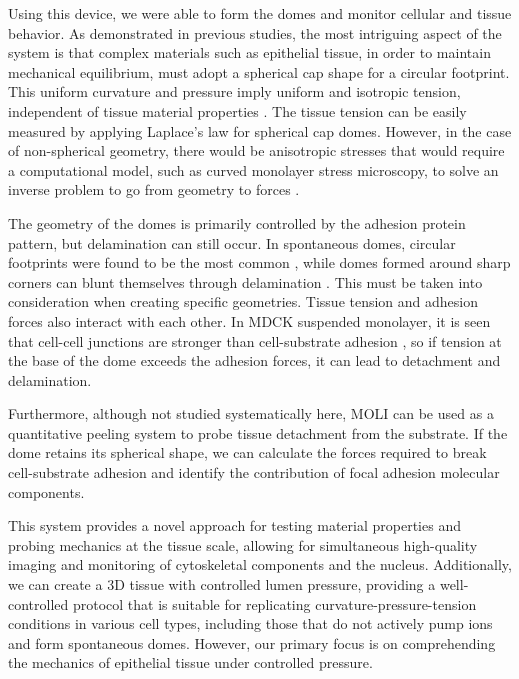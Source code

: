 Using this device, we were able to form the domes and monitor cellular and tissue behavior. As demonstrated in previous studies, the most intriguing aspect of the system is that complex materials such as epithelial tissue, in order to maintain mechanical equilibrium, must adopt a spherical cap shape for a circular footprint. This uniform curvature and pressure imply uniform and isotropic tension, independent of tissue material properties \cite{latorre2018,marin-llaurado2022}. The tissue tension can be easily measured by applying Laplace's law for spherical cap domes. However, in the case of non-spherical geometry, there would be anisotropic stresses that would require a computational model, such as curved monolayer stress microscopy, to solve an inverse problem to go from geometry to forces \cite{marin-llaurado2022}.  

The geometry of the domes is primarily controlled by the adhesion protein pattern, but delamination can still occur. In spontaneous domes, circular footprints were found to be the most common  \cite{tanner1983}, while domes formed around sharp corners can blunt themselves through delamination \cite{latorre2018}. This must be taken into consideration when creating specific geometries. Tissue tension and adhesion forces also interact with each other. In MDCK suspended monolayer, it is seen that cell-cell junctions are stronger than cell-substrate adhesion \cite{harris2012}, so if tension at the base of the dome exceeds the adhesion forces, it can lead to detachment and delamination.  

Furthermore, although not studied systematically here, MOLI can be used as a quantitative peeling system to probe tissue detachment from the substrate. If the dome retains its spherical shape, we can calculate the forces required to break cell-substrate adhesion and identify the contribution of focal adhesion molecular components.

This system provides a novel approach for testing material properties and probing mechanics at the tissue scale, allowing for simultaneous high-quality imaging and monitoring of cytoskeletal components and the nucleus. Additionally, we can create a 3D tissue with controlled lumen pressure, providing a well-controlled protocol that is suitable for replicating curvature-pressure-tension conditions in various cell types, including those that do not actively pump ions and form spontaneous domes. However, our primary focus is on comprehending the mechanics of epithelial tissue under controlled pressure.